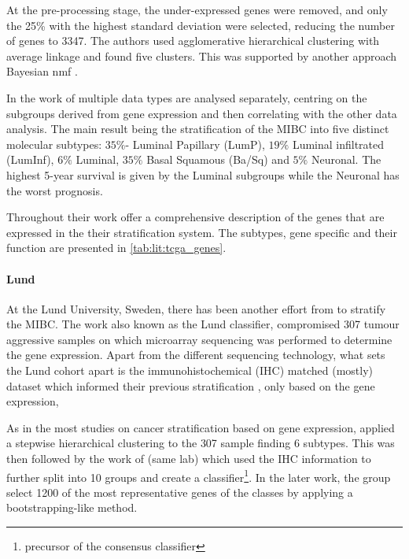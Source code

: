 At the pre-processing stage, the under-expressed genes were removed, and only the 25\% with the highest standard deviation were selected, reducing the number of genes to 3347. The authors used agglomerative hierarchical clustering with average linkage and found five clusters. This was supported by another approach Bayesian \acrfull{nmf} \cite{Schmidt2009-zh}.

In the work of \citet{Robertson2017-mg} multiple data types are analysed separately, centring on the subgroups derived from gene expression and then correlating with the other data analysis. The main result being the stratification of the MIBC into five distinct molecular subtypes: $35\%$- Luminal Papillary (LumP), $19\%$ Luminal infiltrated (LumInf), $6\%$ Luminal, $35\%$ Basal Squamous (Ba/Sq) and $5\%$ Neuronal. The highest 5-year survival is given by the Luminal subgroups while the Neuronal has the worst prognosis. 


Throughout their work \citet{Robertson2017-mg} offer a comprehensive description of the genes that are expressed in the their stratification system. The subtypes, gene specific and their function are presented in \cref{tab:lit:tcga_genes}.


\paragraph*{Lund} \label{s:lit:lund_mibc}

At the Lund University, Sweden, there has been another effort from \citet{Sjodahl2017-xr,Marzouka2018-ge} to stratify the MIBC. The work also known as the Lund classifier, compromised 307 tumour aggressive samples on which microarray sequencing was performed to determine the gene expression. Apart from the different sequencing technology, what sets the Lund cohort apart is the immunohistochemical (IHC) matched (mostly) dataset which informed their previous stratification \citet{Sjodahl2017-xr}, only based on the gene expression,

As in the most studies on cancer stratification based on gene expression, \citet{Sjodahl2017-xr} applied a stepwise hierarchical clustering to the 307 sample finding 6 subtypes. This was then followed by the work of \citet{Marzouka2018-ge} (same lab) which used the IHC information to further split into 10 groups and create a classifier\footnote{precursor of the consensus classifier}. In the later work, the group select 1200 of the most representative genes of the classes by applying a bootstrapping-like method.

